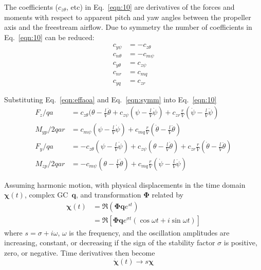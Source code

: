 \documentclass[10pt,openany,twoside]{book}
\numberwithin{equation}{section}   %
\newcommand{\Matrix}[1]{\boldsymbol{#1}}
\newcommand{\Vector}[1]{\boldsymbol{#1}}
\newcommand{\Gc}{GC}
\newcommand{\Eqn}[1]{Eq.\ \ref{#1}}
\begin{document}
The coefficients ($c_{z\theta}$, etc) in \Eqn{eqn:10} are derivatives of the
forces and moments with respect to apparent pitch and yaw angles between the
propeller axis and the freestream airflow.
Due to symmetry the number of coefficients in \Eqn{eqn:10} can be reduced:
\begin{align}\label{eqn:symm}
c_{y\psi} &= -c_{z\theta} \nonumber \\
c_{n\theta} &= -c_{m\psi} \nonumber \\
c_{y\theta} &= c_{z\psi} \nonumber \\
c_{nr} &= c_{mq} \nonumber \\
c_{yq} &= c_{zr}
\end{align}

Substituting \Eqn{eqn:effaoa} and \Eqn{eqn:symm} into \Eqn{eqn:10}
\begin{align}
\label{eqn:10a}
F_z/qa &= c_{z\theta}(\theta - \frac{l}{V}\dot{\theta} + c_{z\psi}(\psi - \frac{l}{V}\dot{\psi}) + c_{zr}\frac{r}{V}(\dot{\psi} - \frac{l}{V}\ddot{\psi}) \nonumber \\
M_{yp}/2qar &= c_{m\psi}(\psi - \frac{l}{V}\dot{\psi}) + c_{mq}\frac{r}{V}(\dot{\theta} - \frac{l}{V}\ddot{\theta}) \nonumber \\
F_y/qa &= -c_{z\theta}(\psi - \frac{l}{V}\dot{\psi}) + c_{z\psi}(\theta - \frac{l}{V}\dot{\theta}) + c_{zr}\frac{r}{V}(\dot{\theta} - \frac{l}{V}\ddot{\theta}) \nonumber \\
M_{zp}/2qar &= -c_{m\psi}(\theta - \frac{l}{V}\dot{\theta}) + c_{mq}\frac{r}{V}(\dot{\psi} - \frac{l}{V}\ddot{\psi})
\end{align}

Assuming harmonic motion, with physical displacements in the time domain $\Vector{\chi}(t)$,
complex \Gc\ $\Vector{q}$, and transformation $\Matrix{\Phi}$ related by
\begin{align} %
\Vector{\chi}(t) & =  \Re \left(\Matrix{\Phi}\Vector{q}e^{st}\right) \nonumber \\
              & =  \Re \left[\Matrix{\Phi}\Vector{q} e^{\sigma t}
				  		\left(\cos \omega t + i \sin \omega t \right) \right]	\nonumber
\end{align}
where $s = \sigma + i\omega$, $\omega$ is the frequency, and the
oscillation amplitudes are increasing, constant, or decreasing if the
sign of the stability factor $\sigma$ is positive, zero, or negative.
Time derivatives then become
\begin{equation}
\dot{\Vector{\chi}}(t) \rightarrow s\Vector{\chi}	\nonumber
\end{equation}
\end{document}
